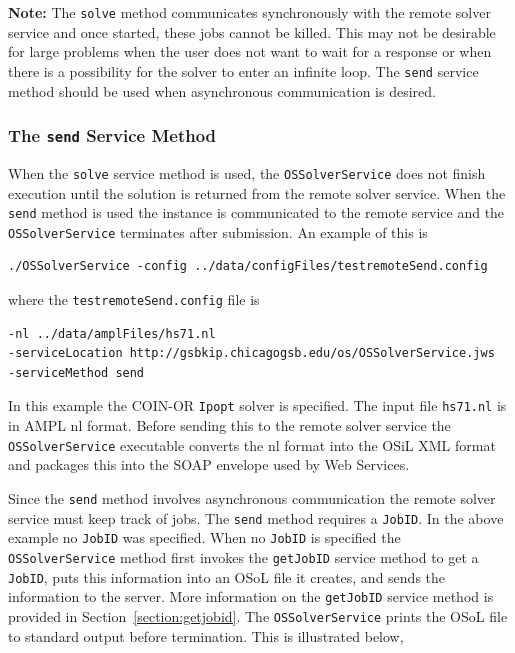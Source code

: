 \documentclass[11pt]{article}
\renewcommand{\_}{{\char"5F}}
\renewcommand{\{}{{\char"7B}}
\renewcommand{\}}{{\char"7D}}
\renewcommand{\^}{{\char"0D}}
\renewcommand{\'}{{\char"0D}}
\begin{document}
\begin{enumerate}[Step 1:]
{\bf Note:} The {\tt solve} method communicates synchronously with the remote solver service
and once started, these jobs cannot be killed. This may not be desirable for large
problems when the user does not want to wait for a response or when there is a possibility
for the solver to enter an infinite loop. The {\tt send} service
method should be used when asynchronous communication is desired.


\subsubsection{The  {\tt send} Service Method}\label{section:send}

When the {\tt solve} service method is used, the {\tt OSSolverService} does not
finish execution until the solution is returned from the remote solver service.
 When the {\tt send}
method is used the instance is communicated to the remote service and the
{\tt OSSolverService} terminates after submission. An example of this is
\begin{verbatim}
./OSSolverService -config ../data/configFiles/testremoteSend.config
\end{verbatim}
where the {\tt testremoteSend.config} file is
\begin{verbatim}
-nl ../data/amplFiles/hs71.nl
-serviceLocation http://gsbkip.chicagogsb.edu/os/OSSolverService.jws
-serviceMethod send
\end{verbatim}
In this example the COIN-OR {\tt Ipopt} solver is specified. The input file {\tt hs71.nl}
is in AMPL nl format.
Before sending this to the remote solver service the {\tt OSSolverService} executable converts  
the nl format into the OSiL XML format and packages this 
into the SOAP envelope used by Web Services.

Since the {\tt send} method involves asynchronous communication the remote solver service must keep track of jobs.
The {\tt send} method requires a {\tt JobID}. In the above example no {\tt JobID} was specified.
When no {\tt JobID} is specified the {\tt OSSolverService} method first invokes the {\tt getJobID} service method
to get a {\tt JobID}, puts this information into an OSoL file it creates, and sends the information
to the server. More information on the {\tt getJobID} service method is provided in Section~\ref{section:getjobid}.
The {\tt OSSolverService} prints the OSoL file to standard output before termination.
This is illustrated below,


\end{enumerate}
\end{document}
